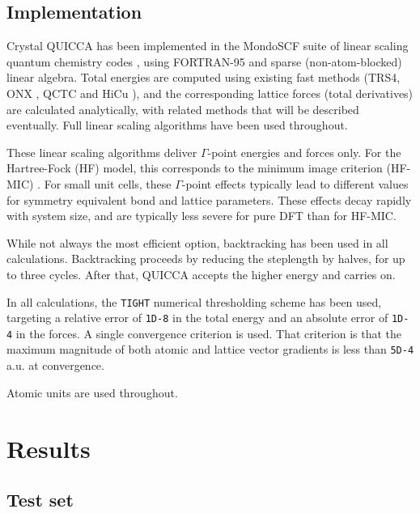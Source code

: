 \twolinestyle{\documentclass[prb,preprint]{revtex4}}
\begin{document}
\subsection{Implementation}

Crystal QUICCA has been implemented in the MondoSCF suite of linear scaling 
quantum chemistry codes \cite{MondoSCF}, using FORTRAN-95 and sparse (non-atom-blocked) 
linear algebra.  Total energies are computed using existing fast methods 
(TRS4\cite{ANiklasson03}, ONX \cite{CTymczak05a}, QCTC and HiCu \cite{CTymczak05b}), 
and the corresponding lattice forces 
(total derivatives) are calculated analytically, with related methods that will be 
described eventually. Full linear scaling algorithms have been used throughout.

These linear scaling algorithms deliver $\Gamma$-point energies and forces only.  
For the Hartree-Fock (HF) model, this corresponds to the minimum image criterion 
(HF-MIC) \cite{CTymczak05a}.  For small unit cells, these $\Gamma$-point effects typically lead 
to different values for symmetry equivalent bond and lattice parameters.  These effects 
decay rapidly with system size, and are typically less severe for pure DFT than for HF-MIC.  

While not always the most efficient option, backtracking has been used in all calculations.
Backtracking proceeds by reducing the steplength by halves, for up to three cycles.  
After that, QUICCA accepts the higher energy and carries on.  

In all calculations, the {\tt TIGHT} numerical thresholding scheme \cite{CTymczak05a} has been used, 
targeting a relative error of {\tt 1D-8} in the total energy and an 
absolute error of {\tt 1D-4} in the forces.  A single convergence criterion is used.
That criterion is that the maximum magnitude of both atomic and lattice vector gradients 
is less than {\tt 5D-4} a.u. at convergence.

Atomic units are used throughout.

\section{Results} \label{results}

\subsection{Test set}
\end{document}
